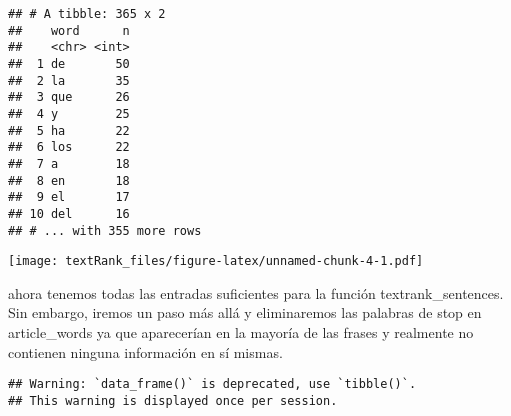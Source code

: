 \documentclass[]{article}
\newenvironment{Shaded}{\begin{snugshade}}{\end{snugshade}}
\newcommand{\KeywordTok}[1]{\textcolor[rgb]{0.13,0.29,0.53}{\textbf{#1}}}
\newcommand{\DataTypeTok}[1]{\textcolor[rgb]{0.13,0.29,0.53}{#1}}
\newcommand{\DecValTok}[1]{\textcolor[rgb]{0.00,0.00,0.81}{#1}}
\newcommand{\StringTok}[1]{\textcolor[rgb]{0.31,0.60,0.02}{#1}}
\newcommand{\OtherTok}[1]{\textcolor[rgb]{0.56,0.35,0.01}{#1}}
\newcommand{\OperatorTok}[1]{\textcolor[rgb]{0.81,0.36,0.00}{\textbf{#1}}}
\newcommand{\NormalTok}[1]{#1}
\begin{document}
\begin{verbatim}
## # A tibble: 365 x 2
##    word      n
##    <chr> <int>
##  1 de       50
##  2 la       35
##  3 que      26
##  4 y        25
##  5 ha       22
##  6 los      22
##  7 a        18
##  8 en       18
##  9 el       17
## 10 del      16
## # ... with 355 more rows
\end{verbatim}

\begin{Shaded}
\end{Shaded}

\texttt{[image: textRank\_files/figure-latex/unnamed-chunk-4-1.pdf]}

ahora tenemos todas las entradas suficientes para la función
textrank\_sentences. Sin embargo, iremos un paso más allá y eliminaremos
las palabras de stop en article\_words ya que aparecerían en la mayoría
de las frases y realmente no contienen ninguna información en sí mismas.

\begin{Shaded}
\end{Shaded}

\begin{verbatim}
## Warning: `data_frame()` is deprecated, use `tibble()`.
## This warning is displayed once per session.
\end{verbatim}
\end{document}

